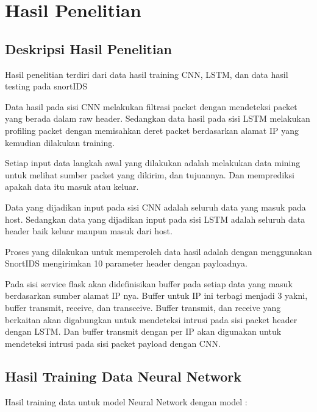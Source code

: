 \documentclass[./skripsi.tex]{subfiles}
\begin{document}
\chapter{Hasil Penelitian}
\section{Deskripsi Hasil Penelitian}
\par Hasil penelitian terdiri dari data hasil training CNN, LSTM, dan data hasil testing pada snortIDS
\par Data hasil pada sisi CNN melakukan filtrasi packet dengan mendeteksi packet yang berada dalam raw header. Sedangkan data hasil pada sisi LSTM melakukan profiling packet dengan memisahkan deret packet berdasarkan alamat IP yang kemudian dilakukan training.
\par Setiap input data langkah awal yang dilakukan adalah melakukan data mining untuk melihat sumber packet yang dikirim, dan tujuannya. Dan memprediksi apakah data itu masuk atau keluar.
\par Data yang dijadikan input pada sisi CNN adalah seluruh data yang masuk pada host. Sedangkan data yang dijadikan input pada sisi LSTM adalah seluruh data header baik keluar maupun masuk dari host.
\par Proses yang dilakukan untuk memperoleh data hasil adalah dengan menggunakan SnortIDS mengirimkan 10 parameter header dengan payloadnya. 
\par Pada sisi service flask akan didefinisikan buffer pada setiap data yang masuk berdasarkan sumber alamat IP nya. Buffer untuk IP ini terbagi menjadi 3 yakni, buffer transmit, receive, dan transceive. Buffer transmit, dan receive yang berkaitan akan digabungkan untuk mendeteksi intrusi pada sisi packet header dengan LSTM. Dan buffer transmit dengan per IP akan digunakan untuk mendeteksi intrusi pada sisi packet payload dengan CNN. 
\section{Hasil Training Data Neural Network}
\par Hasil training data untuk model Neural Network dengan model :
\end{document}
